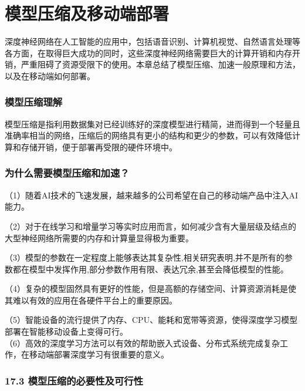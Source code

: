 \chapter{模型压缩及移动端部署}\label{ux7b2cux5341ux4e03ux7ae0-ux6a21ux578bux538bux7f29ux53caux79fbux52a8ux7aefux90e8ux7f72}

​
深度神经网络在人工智能的应用中，包括语音识别、计算机视觉、自然语言处理等各方面，在取得巨大成功的同时，这些深度神经网络需要巨大的计算开销和内存开销，严重阻碍了资源受限下的使用。本章总结了模型压缩、加速一般原理和方法，以及在移动端如何部署。

\subsection{模型压缩理解}\label{ux6a21ux578bux538bux7f29ux7406ux89e3}

​
模型压缩是指利用数据集对已经训练好的深度模型进行精简，进而得到一个轻量且准确率相当的网络，压缩后的网络具有更小的结构和更少的参数，可以有效降低计算和存储开销，便于部署再受限的硬件环境中。

\subsection{为什么需要模型压缩和加速？}\label{ux4e3aux4ec0ux4e48ux9700ux8981ux6a21ux578bux538bux7f29ux548cux52a0ux901f}

（1）随着AI技术的飞速发展，越来越多的公司希望在自己的移动端产品中注入AI能力。

（2）对于在线学习和增量学习等实时应用而言，如何减少含有大量层级及结点的大型神经网络所需要的内存和计算量显得极为重要。

（3）模型的参数在一定程度上能够表达其复杂性,相关研究表明,并不是所有的参数都在模型中发挥作用,部分参数作用有限、表达冗余,甚至会降低模型的性能。

（4）复杂的模型固然具有更好的性能，但是高额的存储空间、计算资源消耗是使其难以有效的应用在各硬件平台上的重要原因。

（5）智能设备的流行提供了内存、CPU、能耗和宽带等资源，使得深度学习模型部署在智能移动设备上变得可行。\\
（6）高效的深度学习方法可以有效的帮助嵌入式设备、分布式系统完成复杂工作，在移动端部署深度学习有很重要的意义。

\subsection{17.3
模型压缩的必要性及可行性}\label{ux6a21ux578bux538bux7f29ux7684ux5fc5ux8981ux6027ux53caux53efux884cux6027}

